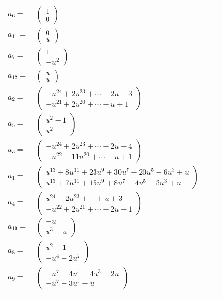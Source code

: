 \documentclass[1p]{elsarticle_modified}
\theoremstyle{definition}
\begin{document}
\begin{tabular}{m{7pt} m{180pt} m{7pt} m{180pt} }
\flushright $a_{6}=$&$\begin{pmatrix}1\\0\end{pmatrix}$ \\
\flushright $a_{11}=$&$\begin{pmatrix}0\\u\end{pmatrix}$ \\
\flushright $a_{7}=$&$\begin{pmatrix}1\\- u^2\end{pmatrix}$ \\
\flushright $a_{12}=$&$\begin{pmatrix}u\\u\end{pmatrix}$ \\
\flushright $a_{2}=$&$\begin{pmatrix}- u^{24}+2 u^{23}+\cdots+2 u-3\\- u^{21}+2 u^{20}+\cdots- u+1\end{pmatrix}$ \\
\flushright $a_{5}=$&$\begin{pmatrix}u^2+1\\u^2\end{pmatrix}$ \\
\flushright $a_{3}=$&$\begin{pmatrix}- u^{24}+2 u^{23}+\cdots+2 u-4\\- u^{22}-11 u^{20}+\cdots- u+1\end{pmatrix}$ \\
\flushright $a_{1}=$&$\begin{pmatrix}u^{13}+8 u^{11}+23 u^9+30 u^7+20 u^5+6 u^3+u\\u^{13}+7 u^{11}+15 u^9+8 u^7-4 u^5-3 u^3+u\end{pmatrix}$ \\
\flushright $a_{4}=$&$\begin{pmatrix}u^{24}-2 u^{23}+\cdots+u+3\\- u^{22}+2 u^{21}+\cdots+2 u-1\end{pmatrix}$ \\
\flushright $a_{10}=$&$\begin{pmatrix}- u\\u^3+u\end{pmatrix}$ \\
\flushright $a_{8}=$&$\begin{pmatrix}u^2+1\\- u^4-2 u^2\end{pmatrix}$ \\
\flushright $a_{9}=$&$\begin{pmatrix}- u^7-4 u^5-4 u^3-2 u\\- u^7-3 u^5+u\end{pmatrix}$\\&\end{tabular}
\end{document}
